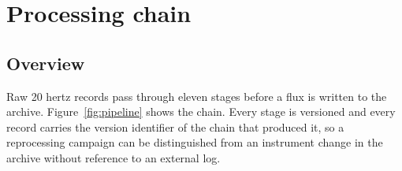 \section{Processing chain}
\label{sec:processing}

\subsection{Overview}
\label{sec:proc-overview}

Raw 20 hertz records pass through eleven stages before a flux is written to the
archive. Figure~\ref{fig:pipeline} shows the chain. Every stage is versioned and
every record carries the version identifier of the chain that produced it, so a
reprocessing campaign can be distinguished from an instrument change in the
archive without reference to an external log.

